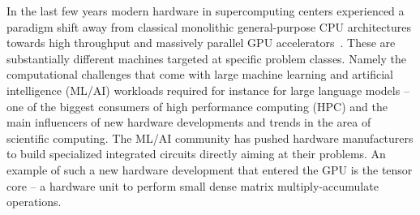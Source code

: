 %
% 
%
%
%


In the last few years modern hardware in supercomputing centers experienced a paradigm shift away from classical monolithic general-purpose CPU architectures towards high throughput and massively parallel GPU accelerators~\cite{online:top500,khan2021analysis,Satoshi:2009,Navarro:2014}.
These are substantially different machines targeted at specific problem classes.
Namely the computational challenges that come with large machine learning and artificial intelligence (ML/AI) workloads required for instance for large language models -- one of the biggest consumers of high performance computing (HPC) and the main influencers of new hardware developments and trends in the area of scientific computing.
The ML/AI community has pushed hardware manufacturers to build specialized integrated circuits directly aiming at their problems.
An example of such a new hardware development that entered the GPU is the tensor core \cite{markidis2018nvidia,10.1007/978-3-030-10549-5_35} -- a hardware unit to perform small dense matrix multiply-accumulate operations.

